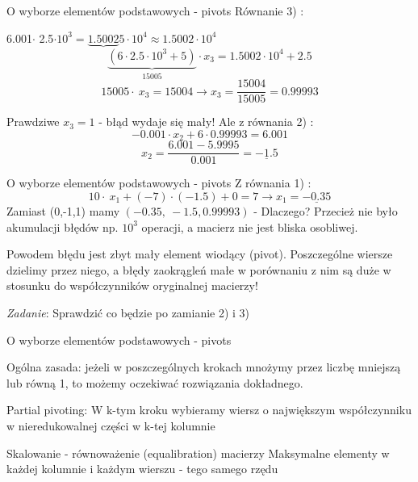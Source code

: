 \begin{frame}{ O wyborze elementów podstawowych - pivots}
Równanie 3) :
\begin{center}
6.001$\cdot$ 2.5$\cdot 10^{3}=\underbrace{1.5002}5\cdot 10^{4} \approx 1.5002\cdot 10^{4}$
$$
\underbrace{(6\cdot 2.5\cdot 10^{3}+5)}_{15005}\cdot x_{3}=1.5002\cdot 10^{4}+2.5
$$
$$
15005\cdot\ x_{3}=15004\rightarrow x_{3}=\frac{15004}{15005}=0.99993
$$
\end{center}
Prawdziwe $x_{3}=1$ - błąd wydaje się mały!
\newline
Ale z równania 2) :
$$
-0.001\cdot x_{2}+6\cdot 0.99993=6.001
$$
$$
x_{2}=\frac{6.001-5.9995}{0.001}=\underline{-1.5}
$$
\end{frame}
\begin{frame}{ O wyborze elementów podstawowych - pivots}
Z równania 1) :
$$
10\cdot\ x_{1}+(-7)\cdot(-1.5)+0=7\rightarrow x_{1}=\underline{-0.35}
$$
Zamiast (0,-1,1) mamy $(-0.35,\ -1.5,0.99993)$ - Dlaczego? \newline 
Przecież nie było akumulacji błędów np. $10^{3}$ operacji, a macierz nie jest bliska osobliwej.
\begin{alertblock}{}
Powodem błędu jest zbyt mały element wiodący (pivot). Poszczególne wiersze dzielimy przez niego, a błędy zaokrągleń małe w porównaniu z nim są duże w stosunku do współczynników oryginalnej macierzy!
\end{alertblock}
\begin{flushright}
\textit{Zadanie}: Sprawdzić co będzie po zamianie 2) i 3) 
\end{flushright}
\end{frame}
\begin{frame}{ O wyborze elementów podstawowych - pivots}

Ogólna zasada: jeżeli w poszczególnych krokach mnożymy przez liczbę mniejszą lub równą 1, to możemy oczekiwać rozwiązania dokładnego.
\begin{exampleblock}{Partial pivoting:}
W $\mathrm{k}$-tym kroku wybieramy wiersz o największym współczynniku w nieredukowalnej części w $\mathrm{k}$-tej kolumnie

\end{exampleblock}

\begin{exampleblock}{Skalowanie - równoważenie (equalibration) macierzy}
Maksymalne elementy w każdej kolumnie i każdym wierszu - tego samego rzędu
\end{exampleblock}

\end{frame}
